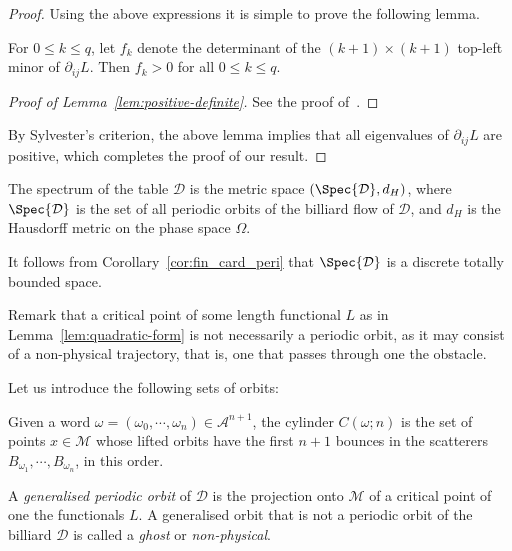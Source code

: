 \documentclass[reqno,11pt]{amsart}
\begin{document}
\begin{proof}
    Using the above expressions it is simple to prove the following lemma.
    \begin{lemma}\label{lem:positive-definite}
        For \( 0 \leq k \leq q \), let \( f_{k} \) denote the determinant of the \( (k+1)\times (k+1) \) top-left minor of \( \partial_{ij}L \).
        Then \( f_{k} > 0 \) for all \( 0 \leq k\leq q \).
    \end{lemma}
    \begin{proof}[Proof of Lemma~\ref{lem:positive-definite}]
   See the proof of~\cite[Lemma A.3]{de2023marked}. 
\end{proof}
    By Sylvester's criterion, the above lemma implies that all eigenvalues of \( \partial_{ij}L \) are positive, which completes the proof of our result.
\end{proof}


\begin{defi}
    The spectrum of the table \( \mathcal{D} \) is the metric space \( (\Spec{\mathcal{D}}, d_H) \), where \( \Spec{\mathcal{D}} \) is the set of all periodic orbits of the billiard flow of \( \mathcal{D} \), and \( d_H \) is the Hausdorff metric on the phase space \( \Omega \).    
\end{defi} 
It follows from Corollary~\ref{cor:fin_card_peri} that \( \Spec{\mathcal{D}} \) is a discrete totally bounded space.

\par 
    Remark that a critical point of some length functional \( L \) as in Lemma~\ref{lem:quadratic-form} is not necessarily a periodic orbit, as it may consist of a non-physical trajectory, that is, one that passes through one the obstacle. 

Let us introduce the following sets of orbits:
\begin{defi}
    Given a word $\omega = (\omega_0, \cdots, \omega_n) \in \mathcal{A}^{n+1}$, the cylinder \( C(\omega; n) \) is the set of points \( x \in \mathcal{M} \) whose lifted orbits have the first \( n+1 \) bounces in the scatterers \( B_{\omega_1}, \cdots, B_{\omega_n} \), in this order.
\end{defi}

\begin{defi}
    A \emph{generalised periodic orbit} of \( \mathcal{D} \) is the projection onto \( \mathcal{M} \) of a critical point of one the functionals \( L \). 
    A generalised orbit that is not a periodic orbit of the billiard \( \mathcal{D} \) is called a \emph{ghost} or \emph{non-physical}. 
\end{defi}
\end{document}
